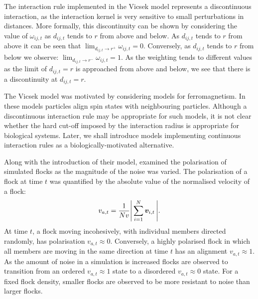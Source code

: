The interaction rule implemented in the Vicsek model represents a discontinuous
interaction, as the interaction kernel is very sensitive to small perturbations in
distances.  More formally, this discontinuity can be shown by considering the value of
$\omega_{ij, t}$ as $d_{ij,t}$ tends to $r$ from above and below.  As $d_{ij,t}$ tends to
$r$ from above it can be seen that $\lim_{d_{ij,t} \rightarrow r^+} \omega_{ij,t} = 0$.
Conversely, as $d_{ij,t}$ tends to $r$ from below we observe: $\lim_{d_{ij,t} \rightarrow
r^-} \omega_{ij,t} = 1$. As the weighting tends to different values as the limit of
$d_{ij,t}=r$ is approached from above and below, we see that there is a discontinuity at
$d_{ij,t}=r$.

The Vicsek model was motivated by considering models for ferromagnetism. In these models
particles align spin states with neighbouring particles. Although a discontinuous
interaction rule may be appropriate for such models, it is not clear whether the
hard cut-off imposed by the interaction radius is appropriate for biological systems.
Later, we shall introduce models implementing continuous interaction rules as a
biologically-motivated alternative.

Along with the introduction of their model, \cite{vicsek95} examined the polarisation of
simulated flocks as the magnitude of the noise was varied. The polarisation of a flock at
time $t$ was quantified by the absolute value of the normalised velocity of a flock:
\begin{equation}
    v_{a,t} = \frac{1}{Nv} \abs{\,\sum_{i=1}^N \bm{v}_{i,t}\,}.
\end{equation}
At time $t$, a flock moving incohesively, with individual members directed randomly, has
polarisation $v_{a,t}\approx0$. Conversely, a highly polarised flock in which all members
are moving in the same direction at time $t$ has an alignment $v_{a,t}\approx1$. As the
amount of noise in a simulation is increased flocks are observed to transition from an
ordered $v_{a,t}\approx1$ state to a disordered $v_{a,t}\approx0$ state. For a fixed flock
density, smaller flocks are observed to be more resistant to noise than larger flocks.

